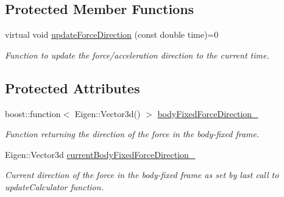 \subsection*{Protected Member Functions}
\begin{DoxyCompactItemize}
\item 
virtual void \hyperlink{classtudat_1_1propulsion_1_1BodyFixedForceDirectionGuidance_abac6943fd9ca3925e7228ac7d40db8f0}{update\+Force\+Direction} (const double time)=0
\begin{DoxyCompactList}\small\item\em Function to update the force/acceleration direction to the current time. \end{DoxyCompactList}\end{DoxyCompactItemize}
\subsection*{Protected Attributes}
\begin{DoxyCompactItemize}
\item 
boost\+::function$<$ Eigen\+::\+Vector3d() $>$ \hyperlink{classtudat_1_1propulsion_1_1BodyFixedForceDirectionGuidance_a03f2926bd81f039d42f3e0e49162a750}{body\+Fixed\+Force\+Direction\+\_\+}\hypertarget{classtudat_1_1propulsion_1_1BodyFixedForceDirectionGuidance_a03f2926bd81f039d42f3e0e49162a750}{}\label{classtudat_1_1propulsion_1_1BodyFixedForceDirectionGuidance_a03f2926bd81f039d42f3e0e49162a750}

\begin{DoxyCompactList}\small\item\em Function returning the direction of the force in the body-\/fixed frame. \end{DoxyCompactList}\item 
Eigen\+::\+Vector3d \hyperlink{classtudat_1_1propulsion_1_1BodyFixedForceDirectionGuidance_ab5201df1ef26337c7ec386489e6a5cec}{current\+Body\+Fixed\+Force\+Direction\+\_\+}\hypertarget{classtudat_1_1propulsion_1_1BodyFixedForceDirectionGuidance_ab5201df1ef26337c7ec386489e6a5cec}{}\label{classtudat_1_1propulsion_1_1BodyFixedForceDirectionGuidance_ab5201df1ef26337c7ec386489e6a5cec}

\begin{DoxyCompactList}\small\item\em Current direction of the force in the body-\/fixed frame as set by last call to update\+Calculator function. \end{DoxyCompactList}\end{DoxyCompactItemize}


